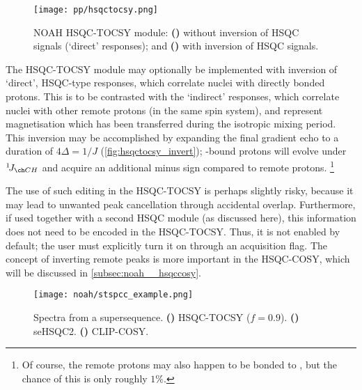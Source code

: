 \begin{figure}[!ht]
    \centering
    \texttt{[image: pp/hsqctocsy.png]}%
    {\label{fig:hsqctocsy_base}}%
    {\label{fig:hsqctocsy_invert}}%
    \caption[NOAH HSQC-TOCSY module]{
        NOAH HSQC-TOCSY module:
        \textbf{()} without inversion of HSQC signals (`direct' responses); and
        \textbf{()} with inversion of HSQC signals.
    }
    \label{fig:hsqctocsy}
\end{figure}

The HSQC-TOCSY module may optionally be implemented with inversion of `direct', HSQC-type responses, which correlate \carbon{} nuclei with directly bonded protons.
This is to be contrasted with the `indirect' responses, which correlate \carbon{} nuclei with other remote protons (in the same spin system), and represent magnetisation which has been transferred during the isotropic mixing period.
This inversion may be accomplished by expanding the final gradient echo to a duration of $4\Delta = 1/J$ (\cref{fig:hsqctocsy_invert}); \carbon{}-bound protons will evolve under $\oneJ{CH}$ and acquire an additional minus sign compared to remote protons.%
\footnote{Of course, the remote protons may also happen to be bonded to \carbon{}, but the chance of this is only roughly $1\%$.}

The use of such editing in the HSQC-TOCSY is perhaps slightly risky, because it may lead to unwanted peak cancellation through accidental overlap.
Furthermore, if used together with a second HSQC module (as discussed here), this information does not need to be encoded in the HSQC-TOCSY.
Thus, it is not enabled by default; the user must explicitly turn it on through an acquisition flag.
The concept of inverting remote peaks is more important in the HSQC-COSY, which will be discussed in \cref{subsec:noah__hsqccosy}.

\begin{figure}[!ht]
    \centering
    \texttt{[image: noah/stspcc\_example.png]}%
    {\label{fig:stspcc_example_st}}%
    {\label{fig:stspcc_example_sp}}%
    {\label{fig:stspcc_example_cc}}%
    \caption[Spectra from a  supersequence]{
        Spectra from a  supersequence.
        \textbf{()} HSQC-TOCSY ($f = 0.9$).
        \textbf{()} seHSQC2.
        \textbf{()} CLIP-COSY.
    }
    \label{fig:stspcc_example}
\end{figure}

